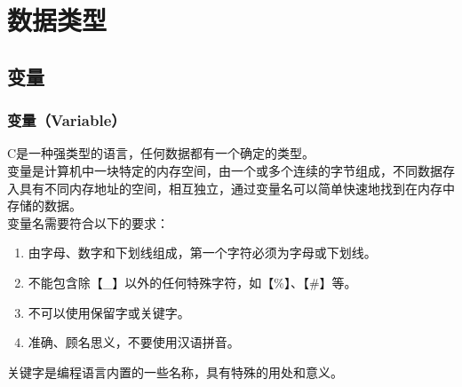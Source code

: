 \chapter{数据类型}

\section{变量}

\subsection{变量（Variable）}

C是一种强类型的语言，任何数据都有一个确定的类型。\\

变量是计算机中一块特定的内存空间，由一个或多个连续的字节组成，不同数据存入具有不同内存地址的空间，相互独立，通过变量名可以简单快速地找到在内存中存储的数据。\\

变量名需要符合以下的要求：

\begin{enumerate}
	\item 由字母、数字和下划线组成，第一个字符必须为字母或下划线。
	\item 不能包含除【\_】以外的任何特殊字符，如【\%】、【\#】等。
	\item 不可以使用保留字或关键字。
	\item 准确、顾名思义，不要使用汉语拼音。
\end{enumerate}

关键字是编程语言内置的一些名称，具有特殊的用处和意义。

\begin{table}[H]
	\centering
	\caption{关键字}
\end{table}

